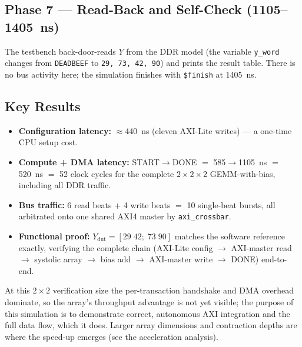 \subsection{Phase 7 --- Read-Back and Self-Check (\SI{1105}{}--\SI{1405}{ns})}

The testbench back-door-reads $Y$ from the DDR model (the variable
\texttt{y\_word} changes from \texttt{DEADBEEF} to \texttt{29,\,73,\,42,\,90}) and
prints the result table. There is no bus activity here; the simulation finishes
with \texttt{\$finish} at \SI{1405}{ns}.

\subsection{Key Results}

\begin{itemize}
  \item \textbf{Configuration latency:} $\approx$\SI{440}{ns} (eleven AXI-Lite
        writes) --- a one-time CPU setup cost.
  \item \textbf{Compute + DMA latency:} START$\rightarrow$DONE $=$
        585$\rightarrow$\SI{1105}{ns} $=$ \SI{520}{ns} $=$ 52 clock cycles for
        the complete $2\times2\times2$ GEMM-with-bias, including all DDR traffic.
  \item \textbf{Bus traffic:} 6 read beats + 4 write beats $=$ 10 single-beat
        bursts, all arbitrated onto one shared AXI4 master by
        \texttt{axi\_crossbar}.
  \item \textbf{Functional proof:} $Y_\text{dut}=[29\;42;\;73\;90]$ matches the
        software reference exactly, verifying the complete chain
        (AXI-Lite config $\rightarrow$ AXI-master read $\rightarrow$ systolic
        array $\rightarrow$ bias add $\rightarrow$ AXI-master write
        $\rightarrow$ DONE) end-to-end.
\end{itemize}

\noindent At this $2\times2$ verification size the per-transaction handshake and
DMA overhead dominate, so the array's throughput advantage is not yet visible;
the purpose of this simulation is to demonstrate correct, autonomous AXI
integration and the full data flow, which it does. Larger array dimensions and
contraction depths are where the speed-up emerges (see the acceleration
analysis).
